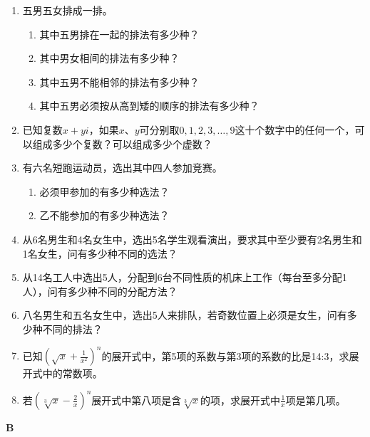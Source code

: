 \begin{enumerate}
 \item 五男五女排成一排。
\begin{enumerate}[(1)]
    \item 其中五男排在一起的排法有多少种？
    \item 其中男女相间的排法有多少种？
    \item 其中五男不能相邻的排法有多少种？
    \item 其中五男必须按从高到矮的顺序的排法有多少种？
\end{enumerate}
    \item 已知复数$ x+yi$，如果$x$、$y$可分别取$0,1,2,3,\ldots, 9$这十个数字中的任何一个，可以组成多少个复数？可以组成多少个虚数？
    \item 有六名短跑运动员，选出其中四人参加竞赛。
\begin{enumerate}[(1)]
    \item 必须甲参加的有多少种选法？
    \item 乙不能参加的有多少种选法？
\end{enumerate}
 \item 从6名男生和4名女生中，选出5名学生观看演出，要求其中至少要有2名男生和1名女生，问有多少种不同的选法？

 \item 从14名工人中选出5人，分配到6台不同性质的机床上工作（每台至多分配1人），问有多少种不同的分配方法？

 \item 八名男生和五名女生中，选出5人来排队，若奇数位置上必须是女生，问有多少种不同的排法？
 \item 已知$\left(\sqrt{x}+\frac{1}{x^{2}}\right)^{n} $的展开式中，第5项的系数与第3项的系数的比是14:3，求展开式中的常数项。

 \item 若$\left(\sqrt[3]{x}-\frac{2}{x}\right)^{n} $展开式中第八项是含$ \sqrt[3]{x} $的项，求展开式中$ \frac{1}{x} $项是第几项。
\end{enumerate}

\begin{center}
\bfseries B
\end{center}

